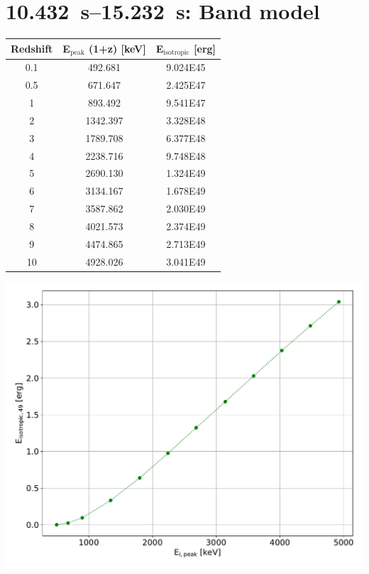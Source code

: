 \documentclass[10pt,report]{article}
\begin{document}

	\section{\SIrange{10.432}{15.232}{\second}: Band model}
	\begin{minipage}[l]{0.48\textwidth}
		\centering
		\begin{tabular}{ccc}
			\toprule
			Redshift & E$_\text{peak}$ (1+z) [keV]& E$_\text{isotropic}$ [erg] \\
			\midrule
			0.1 & 492.681 & \num{9.024E45}\\
			0.5 & 671.647 & \num{2.425E47}\\
			1 & 893.492 & \num{9.541E47}\\
			2 & 1342.397 & \num{3.328E48}\\
			3 & 1789.708 & \num{6.377E48}\\
			4 & 2238.716 & \num{9.748E48}\\
			5 & 2690.130 & \num{1.324E49}\\
			6 & 3134.167 & \num{1.678E49}\\
			7 & 3587.862 & \num{2.030E49}\\
			8 & 4021.573 & \num{2.374E49}\\
			9 & 4474.865 & \num{2.713E49}\\
			10 & 4928.026 & \num{3.041E49}\\
			\bottomrule
		\end{tabular}
	\end{minipage}
	\hfill
	\begin{minipage}[r]{0.48\textwidth}
		\centering
		\includegraphics[width=\textwidth]{../ep2/Ep2__eipeak_eisotropic}%
	\end{minipage}%
\end{document}
